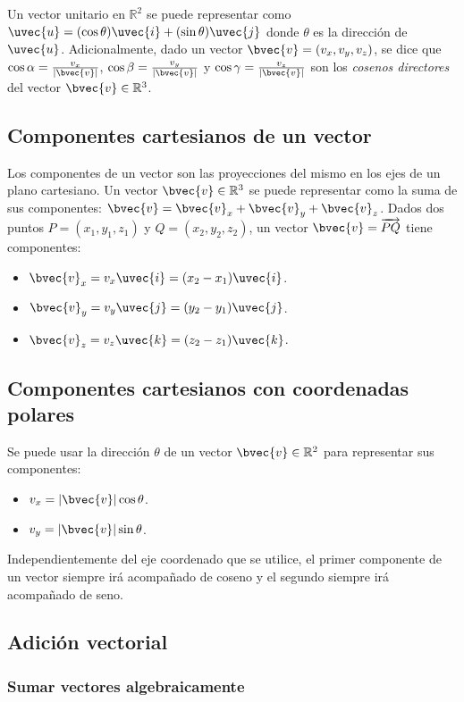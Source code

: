 \documentclass{fmbnotes}
\begin{document}
Un vector unitario en \( \mathbb{R}^{2} \) se puede representar como \(\uvec{u}=(\cos \theta)\uvec{i}+(\sin \theta )\uvec{j}\) donde \(\theta\) es la dirección de \(\uvec{u}\). Adicionalmente, dado un vector \(\bvec{v}=(v_x,v_y,v_z)\), se dice que \(\cos \alpha=\frac{v_x}{\left|\bvec{v}\right|}\), \(\cos \beta=\frac{v_y}{\left|\bvec{v}\right|}\) y \(\cos \gamma=\frac{v_z}{\left|\bvec{v}\right|}\) son los \emph{cosenos directores} del vector \( \bvec{v} \in \mathbb{R}^{3}\).

\subsection{Componentes cartesianos de un vector}
Los componentes de un vector son las proyecciones del mismo en los ejes de un plano cartesiano. Un vector \(\bvec{v} \in \mathbb{R}^{3} \) se puede representar como la suma de sus componentes: \(\bvec{v}=\bvec{v}_x+\bvec{v}_y+\bvec{v}_z\). Dados dos puntos \(P=(x_1, y_1, z_1)\) y \(Q=(x_2, y_2, z_2)\), un vector \(\bvec{v}=\overrightarrow{PQ}\) tiene componentes:
\begin{itemize}
\item \(\bvec{v}_x = v_x\uvec{i}=(x_2-x_1)\uvec{i}\).
\item \(\bvec{v}_y = v_y\uvec{j}=(y_2-y_1)\uvec{j}\).
\item \(\bvec{v}_z = v_z\uvec{k}=(z_2-z_1)\uvec{k}\).
\end{itemize}

\subsection{Componentes cartesianos con coordenadas polares}
Se puede usar la dirección \(\theta\) de un vector \(\bvec{v} \in \mathbb{R}^{2}\) para representar sus componentes:
\begin{itemize}
\item \(v_x=\left|\bvec{v}\right| \cos \theta\).
\item \(v_y=\left|\bvec{v}\right| \sin \theta\).
\end{itemize}
Independientemente del eje coordenado que se utilice, el primer componente de un vector siempre irá acompañado de coseno y el segundo siempre irá acompañado de seno.

\subsection{Adición vectorial}

\subsubsection{Sumar vectores algebraicamente}
\end{document}
